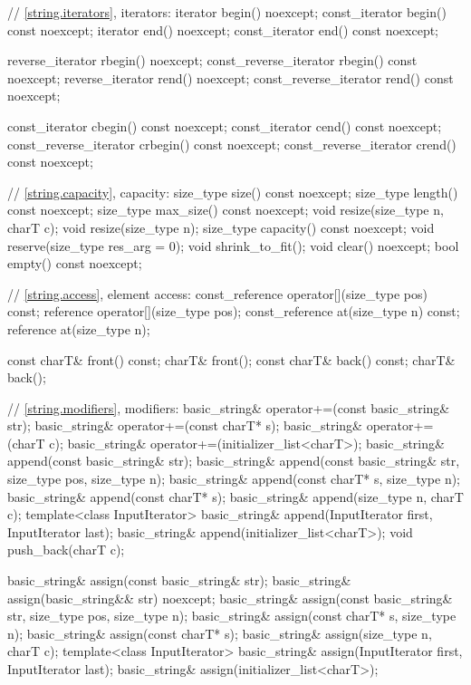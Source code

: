 \begin{codeblock}
{{    // \ref{string.iterators}, iterators:
    iterator       begin() noexcept;
    const_iterator begin() const noexcept;
    iterator       end() noexcept;
    const_iterator end() const noexcept;

    reverse_iterator       rbegin() noexcept;
    const_reverse_iterator rbegin() const noexcept;
    reverse_iterator       rend() noexcept;
    const_reverse_iterator rend() const noexcept;

    const_iterator         cbegin() const noexcept;
    const_iterator         cend() const noexcept;
    const_reverse_iterator crbegin() const noexcept;
    const_reverse_iterator crend() const noexcept;

    // \ref{string.capacity}, capacity:
    size_type size() const noexcept;
    size_type length() const noexcept;
    size_type max_size() const noexcept;
    void resize(size_type n, charT c);
    void resize(size_type n);
    size_type capacity() const noexcept;
    void reserve(size_type res_arg = 0);
    void shrink_to_fit();
    void clear() noexcept;
    bool empty() const noexcept;

    // \ref{string.access}, element access:
    const_reference operator[](size_type pos) const;
    reference       operator[](size_type pos);
    const_reference at(size_type n) const;
    reference       at(size_type n);

    const charT& front() const;
    charT& front();
    const charT& back() const;
    charT& back();

    // \ref{string.modifiers}, modifiers:
    basic_string& operator+=(const basic_string& str);
    basic_string& operator+=(const charT* s);
    basic_string& operator+=(charT c);
    basic_string& operator+=(initializer_list<charT>);
    basic_string& append(const basic_string& str);
    basic_string& append(const basic_string& str, size_type pos,
                         size_type n);
    basic_string& append(const charT* s, size_type n);
    basic_string& append(const charT* s);
    basic_string& append(size_type n, charT c);
    template<class InputIterator>
      basic_string& append(InputIterator first, InputIterator last);
    basic_string& append(initializer_list<charT>);
    void push_back(charT c);

    basic_string& assign(const basic_string& str);
    basic_string& assign(basic_string&& str) noexcept;
    basic_string& assign(const basic_string& str, size_type pos,
                         size_type n);
    basic_string& assign(const charT* s, size_type n);
    basic_string& assign(const charT* s);
    basic_string& assign(size_type n, charT c);
    template<class InputIterator>
      basic_string& assign(InputIterator first, InputIterator last);
    basic_string& assign(initializer_list<charT>);

}}
\end{codeblock}
